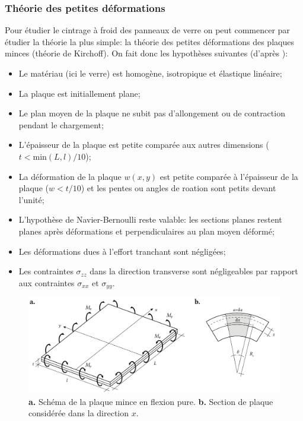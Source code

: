 \documentclass[11pt,titlepage]{article}
\begin{document}
\subsubsection{Théorie des petites déformations}
Pour étudier le cintrage à froid des panneaux de verre on peut commencer par étudier la théorie la plus simple: la théorie des petites déformations des plaques minces (théorie de Kirchoff). On fait donc les hypothèses suivantes (d'après \Textcite{mcst2}):
\begin{itemize}
    \item Le matériau (ici  le verre) est homogène, isotropique et élastique linéaire;
    \item La plaque est initiallement plane;
    \item Le plan moyen de la plaque ne subit pas d'allongement ou de contraction pendant le chargement;
    \item L'épaisseur de la plaque est petite comparée aux autres dimensions ($t < \text{min}(L,l)/10$);
    \item La déformation de la plaque $w(x,y)$ est petite comparée à l'épaisseur de la plaque ($w < t/10$) et les pentes ou angles de roation sont petits devant l'unité;
    \item L'hypothèse de Navier-Bernoulli reste valable: les sections planes restent planes après déformations et perpendiculaires au plan moyen déformé;
    \item Les déformations dues à l'effort tranchant sont négligées;
    \item Les contraintes $\sigma_{zz}$ dans la direction transverse sont négligeables par rapport aux contraintes $\sigma_{xx}$ et $\sigma_{yy}$.
\end{itemize}

\begin{figure}[H]
    \centering
    \includegraphics[width=\textwidth]{img/cintrage_froid/petitedef.pdf}
    \caption{\textbf{a.} Schéma de la plaque mince en flexion pure. \textbf{b.} Section de plaque considérée dans la direction $x$.}
    \label{fig:petite_def}
\end{figure}
\end{document}
